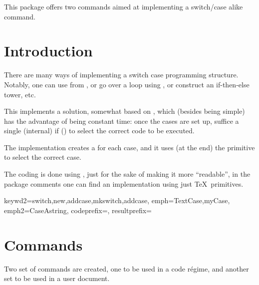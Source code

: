 \documentclass[10pt]{article}
\begin{document}
  

\begin{typesetabstract}
 
This package offers two commands aimed at implementing a switch/case alike command.
\end{typesetabstract}

\tableofcontents

\section{Introduction}
There are many ways of implementing a switch case programming structure. Notably, one can use  from , or go over a loop using \tsobj{\pdfstrcmp}, or construct an if-then-else tower, etc.

This implements a solution, somewhat based on  \cite{stackexchage:switchcase}, which (besides being simple) has the advantage of being constant time: once the cases are set up, suffice a single (internal) if (\tsobj{\ifcsname}) to select the correct code to be executed. 



\begin{tsremark}
  The implementation creates a \tsobj{\csname} for each case, and it uses (at the end) the primitive \tsobj{\ifcsname} to select the correct case.
\end{tsremark}
\begin{tsremark}
  The coding is done using , just for the sake of making it more ``readable'', in the package comments one can find an implementation using just \TeX\  primitives.
\end{tsremark}

  {
    keywd2={switch,new,addcase,mkswitch,addcase},
    emph={TextCase,myCase},
    emph2={CaseAstring},
    codeprefix={},
    resultprefix={}
  }


\section{Commands}
Two set of commands are created, one to be used in a  code régime, and another set to be used in a user document.
\end{document}
